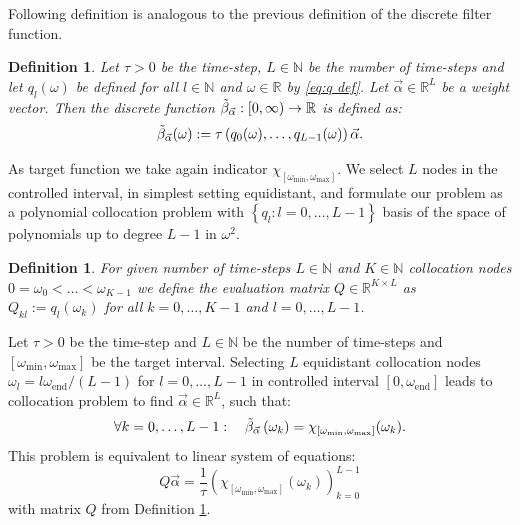 \documentclass[a4paper,11pt,bibliography=totoc,listof=totoc,headinclude=true,cleardoublepage=empty,oneside]{scrbook}
\newtheorem{definition}[theorem]{Definition}
\newcommand{\R}{\mathbb{R}}
\newcommand{\N}{\mathbb{N}}
\newcommand{\dffv}{\Tilde{\beta}_{\Vec{\alpha}}}
\newcommand{\e}{\mathrm{end}}
\begin{document}
Following definition is analogous to the previous definition of the discrete filter function.

\begin{definition}
    Let $\tau > 0$ be the time-step, $L\in \N$ be the number of time-steps and let $q_l(\omega)$ be defined for all $l \in \N$ and $\omega \in \R$ by \eqref{eq:q def}. Let $\Vec{\alpha}\in\R^L$ be a weight vector. Then the discrete function $\dffv: [0, \infty) \rightarrow \R$ is defined as:
    \begin{equation}\label{eq:dffv}
        \dffv (\omega) := \tau \left(q_0(\omega), \dots, q_{L-1}(\omega)\right) \Vec{\alpha}. 
    \end{equation}
\end{definition}

As target function we take again indicator $\chi_{\left[\omega_{\min}, \omega_{\max}\right]}$. We select $L$ nodes in the controlled interval, in simplest setting equidistant, and formulate our problem as a polynomial collocation problem with $\left\{q_l : l=0, \dots, L-1\right\}$ basis of the space of polynomials up to degree $L-1$ in $\omega^2$.
\begin{definition}\label{def:evaluation matrix}
    For given number of time-steps $L\in \N$ and $K\in \N$ collocation nodes $ 0 = \omega_0 < \dots < \omega_{K-1}$ we define the evaluation matrix $Q \in \R^{K\times L}$ as $Q_{kl} := q_l\left(\omega_k\right)$ for all $k=0, \dots, K-1$ and $l=0, \dots, L-1$. 
\end{definition}

Let $\tau>0$ be the time-step and $L\in \N$ be the number of time-steps and $\left[\omega_{\min}, \omega_{\max}\right]$ be the target interval. Selecting $L$ equidistant collocation nodes $\omega_l = l\omega_\e/ (L-1)$ for $l=0, \dots, L-1$ in controlled interval $\left[0, \omega_{\e}\right]$ leads to collocation problem to find $\Vec{\alpha} \in \R^L$, such that:
\begin{equation*}
    \forall k = 0, \dots, L-1: \quad \dffv\left(\omega_k\right) = \chi_{\left[\omega_{\min}, \omega_{\max}\right]}(\omega_k).
\end{equation*}
This problem is equivalent to linear system of equations:
\begin{equation}\label{eq:alpha eq coll}
     Q \Vec{\alpha} = \frac{1}{\tau} \left(\chi_{\left[\omega_{\min}, \omega_{\max}\right]}(\omega_k) \right)_{k=0}^{L-1}
\end{equation}
with matrix $Q$ from Definition \ref{def:evaluation matrix}.
\end{document}
